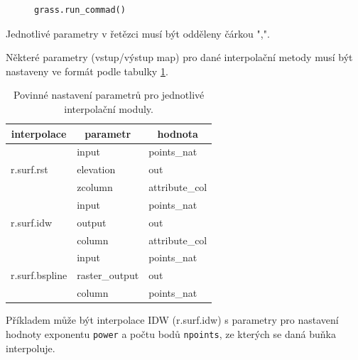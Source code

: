 \documentclass[a4paper,12pt,oneside]{report}
\begin{document}
\begin{figure}[h!]
\begin{footnotesize}
\lstset{extendedchars=false,
escapeinside=''}
\begin{lstlisting}[style=mybash]
grass.run_commad()                                                           
\end{lstlisting}
\end{footnotesize}
\end{figure}
Jednotlivé parametry v řetězci musí být odděleny čárkou ",".

Některé parametry (vstup/výstup map) pro dané interpolační metody musí
být nastaveny ve formát podle tabulky \ref{tab:interpol}.

\begin{table}[h]
\centering
\begin{tabular}{|lll|}
\hline
\multicolumn{1}{|c}{interpolace} & \multicolumn{1}{c}{parametr} & \multicolumn{1}{c|}{hodnota} \\ \hline\hline
\multirow{3}{*}{r.surf.rst}      & input                        & points\_nat                  \\
                                 & elevation                    & out                          \\
                                 & zcolumn                      & attribute\_col               \\\hline
\multirow{3}{*}{r.surf.idw}      & input                        & points\_nat                  \\
                                 & output                       & out                          \\
                                 & column                       & attribute\_col               \\\hline
\multirow{3}{*}{r.surf.bspline}  & input                        & points\_nat                  \\
                                 & raster\_output               & out                          \\
                                 & column                       & points\_nat                  \\ \hline
\end{tabular}
\caption{Povinné nastavení parametrů pro jednotlivé interpolační moduly.}
\label{tab:interpol}
\end{table}



Příkladem může být interpolace IDW (r.surf.idw) s parametry pro
nastavení hodnoty exponentu \texttt{power} a počtu bodů
\texttt{npoints}, ze kterých se daná buňka interpoluje.
\end{document}

